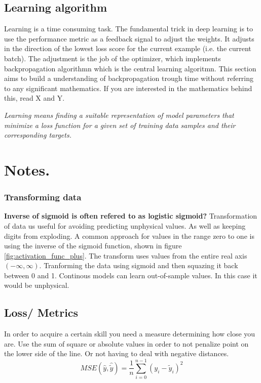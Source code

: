 \subsection{Learning algorithm} \label{sec:backprop_learning_algorithm}
Learning is a time consuming task. The fundamental trick in deep learning is to use the performance metric as a feedback signal to adjust the weights. It adjusts in the direction of the lowest loss score for the current example (i.e. the current batch). The adjustment is the job of the optimizer, which implements backpropagation algorithmn which is the central learning algoritmn. This section aims to build a understanding of backpropagation trough time without referring to any significant mathematics. If you are interested in the mathematics behind this, read X and Y. 

\textit{Learning means finding a suitable representation of model parameters that minimize a loss function for a given set of training data samples and their corresponding targets.}

\section{Notes.}

\subsubsection{Transforming data} \label{sec:transforming_cloud_cover}
\textbf{Inverse of sigmoid is often refered to as logistic sigmoid?}
Transformation of data us useful for avoiding predicting unphysical values. As well as keeping digits from exploding.
A common approach for values in the range zero to one is using the inverse of the sigmoid function, shown in figure \ref{fig:activation_func_plus}. The transform uses values from the entire real axis $(-\infty, \infty)$. 
%
Tranforming the data using sigmoid and then squazing it back between 0 and 1. 
Continous models can learn out-of-sample values. In this case it would be unphysical.

\subsection{Loss/ Metrics}  \label{sec:metrics}
In order to acquire a certain skill you need a measure determining how close you are. 
Use the sum of square or absolute values in order to not penalize point on the lower side of the line. Or not having to deal with negative distances. 
\begin{equation} \label{eq:mse}
    MSE(\hat{y},\hat{\tilde{y}}) = \frac{1}{n} \sum_{i=0}^{n-1}(y_i-\tilde{y}_i)^2
\end{equation} 

